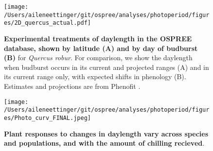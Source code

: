 \documentclass{article}
\begin{document}
\begin{figure}[p]
\texttt{[image: /Users/aileneettinger/git/ospree/analyses/photoperiod/figures/2D\_quercus\_actual.pdf]} 
\caption{\textbf{Experimental treatments of daylength in the OSPREE database, shown by latitude (A) and by day of budburst (B)} for \textit{Quercus robur}. For comparison, we show the daylength when budburst occurs in its current and projected ranges (A) and in its current range only, with expected shifts in phenology (B). Estimates and projections are from Phenofit \citep{duputie2015}.}
 \label{fig:quercus}
 \end{figure}
 
 \begin{figure}[p]
\texttt{[image: /Users/aileneettinger/git/ospree/analyses/photoperiod/figures/Photo\_curv\_FINAL.jpeg]} 
\caption{\textbf{Plant responses to changes in daylength vary across species and populations, and with the amount of chilling recieved}.}
 \label{fig:photocurve}
 \end{figure}
\end{document}
